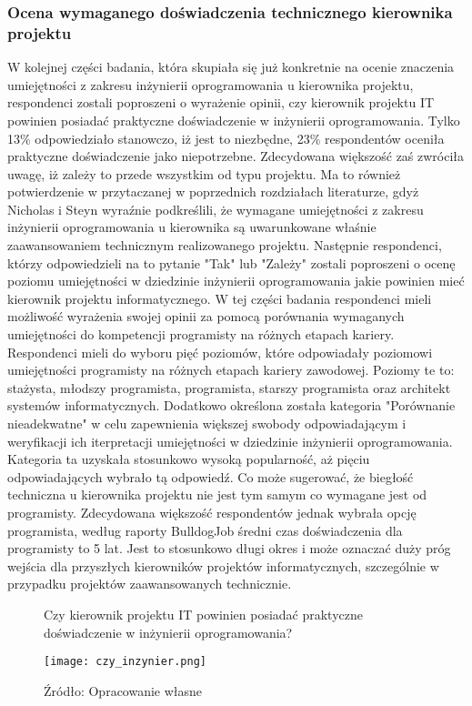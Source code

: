 \subsubsection{Ocena wymaganego doświadczenia technicznego kierownika projektu}
W kolejnej części badania, która skupiała się już konkretnie na ocenie znaczenia umiejętności z zakresu inżynierii oprogramowania u kierownika projektu, respondenci zostali poproszeni o wyrażenie opinii, czy kierownik projektu IT powinien posiadać praktyczne doświadczenie w inżynierii oprogramowania. Tylko 13\% odpowiedziało stanowczo, iż jest to niezbędne, 23\% respondentów oceniła praktyczne doświadczenie jako niepotrzebne. Zdecydowana większość zaś zwróciła uwagę, iż zależy to przede wszystkim od typu projektu. Ma to również potwierdzenie w przytaczanej w poprzednich rozdziałach literaturze, gdyż Nicholas i Steyn\autocite{NicholasSteyn} wyraźnie podkreślili, że wymagane umiejętności z zakresu inżynierii oprogramowania u kierownika są uwarunkowane właśnie zaawansowaniem technicznym realizowanego projektu.
Następnie respondenci, którzy odpowiedzieli na to pytanie "Tak" lub "Zależy" zostali poproszeni o ocenę poziomu umiejętności w dziedzinie inżynierii oprogramowania jakie powinien mieć kierownik projektu informatycznego. W tej części badania respondenci mieli możliwość wyrażenia swojej opinii za pomocą porównania wymaganych umiejętności do kompetencji programisty na różnych etapach kariery. Respondenci mieli do wyboru pięć poziomów, które odpowiadały poziomowi umiejętności programisty na różnych etapach kariery zawodowej. Poziomy te to: stażysta, młodszy programista, programista, starszy programista oraz architekt systemów informatycznych. Dodatkowo określona została kategoria "Porównanie nieadekwatne" w celu zapewnienia większej swobody odpowiadającym i weryfikacji ich iterpretacji umiejętności w dziedzinie inżynierii oprogramowania. Kategoria ta uzyskała stosunkowo wysoką popularność, aż pięciu odpowiadających wybrało tą odpowiedź. Co może sugerować, że biegłość techniczna u kierownika projektu nie jest tym samym co wymagane jest od programisty. Zdecydowana większość respondentów jednak wybrała opcję programista, według raporty BulldogJob średni czas doświadczenia dla programisty to 5 lat\autocite{BulldogJob}. Jest to stosunkowo długi okres i może oznaczać duży próg wejścia dla przyszłych kierowników projektów informatycznych, szczególnie w przypadku projektów zaawansowanych technicznie.

\begin{figure}
  \caption{Czy kierownik projektu IT powinien posiadać praktyczne doświadczenie w inżynierii oprogramowania?}
  \centering
  \texttt{[image: czy\_inzynier.png]}
  \caption*{Źródło: Opracowanie własne}
\end{figure}

